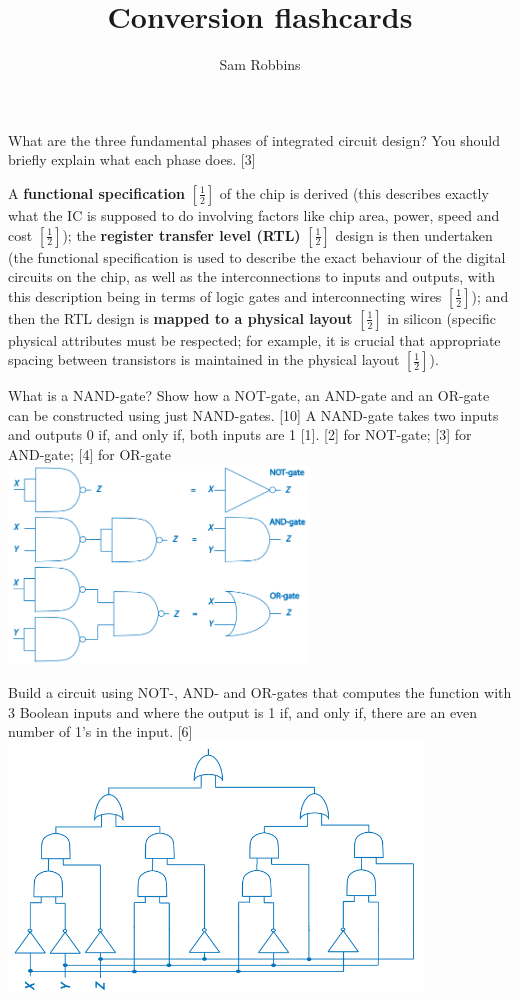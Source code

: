 \documentclass[grid,avery5388]{flashcards}
\title{Conversion flashcards}
\author{Sam Robbins}
\begin{document}
\begin{flashcard}[]{What are the three fundamental phases of integrated circuit design?
You should briefly explain what each phase does. [3]}

A \textbf{functional specification} $[\frac{1}{2}]$ of the chip is derived (this describes
exactly what the IC is supposed to do involving factors like chip area,
power, speed and cost $[\frac{1}{2}]$); the \textbf{register transfer level (RTL)} $[\frac{1}{2}]$ design
is then undertaken (the functional specification is used to describe
the exact behaviour of the digital circuits on the chip, as well as the
interconnections to inputs and outputs, with this description being in
terms of logic gates and interconnecting wires $[\frac{1}{2}]$); and then the RTL
design is \textbf{mapped to a physical layout} $[\frac{1}{2}]$ in silicon (specific physical
attributes must be respected; for example, it is crucial that appropriate
spacing between transistors is maintained in the physical layout $[\frac{1}{2}]$).
\end{flashcard}

\begin{flashcard}[]{What is a NAND-gate? Show how a NOT-gate, an AND-gate and an
OR-gate can be constructed using just NAND-gates. [10]}
A NAND-gate takes two inputs and outputs 0 if, and only if, both
inputs are 1 [1]. [2] for NOT-gate; [3] for AND-gate; [4] for OR-gate\\
\includegraphics[width=8cm]{NAND.png}
\end{flashcard}

\begin{flashcard}[]{Build a circuit using NOT-, AND- and OR-gates that computes the
function with 3 Boolean inputs and where the output is 1 if, and only
if, there are an even number of 1’s in the input. [6]}
\includegraphics[width=11cm]{even.png}
\end{flashcard}
\end{document}
